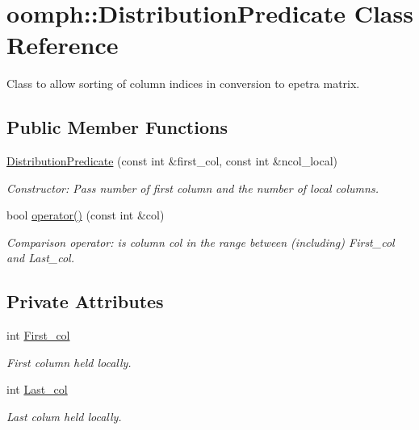 \hypertarget{classoomph_1_1DistributionPredicate}{}\section{oomph\+:\+:Distribution\+Predicate Class Reference}
\label{classoomph_1_1DistributionPredicate}


Class to allow sorting of column indices in conversion to epetra matrix.  


\subsection*{Public Member Functions}
\begin{DoxyCompactItemize}
\item 
\hyperlink{classoomph_1_1DistributionPredicate_a6eed861d5dca10c4118de4857705fd92}{Distribution\+Predicate} (const int \&first\+\_\+col, const int \&ncol\+\_\+local)
\begin{DoxyCompactList}\small\item\em Constructor\+: Pass number of first column and the number of local columns. \end{DoxyCompactList}\item 
bool \hyperlink{classoomph_1_1DistributionPredicate_a701adea6dabe769c65afc647b655f39f}{operator()} (const int \&col)
\begin{DoxyCompactList}\small\item\em Comparison operator\+: is column col in the range between (including) First\+\_\+col and Last\+\_\+col. \end{DoxyCompactList}\end{DoxyCompactItemize}
\subsection*{Private Attributes}
\begin{DoxyCompactItemize}
\item 
int \hyperlink{classoomph_1_1DistributionPredicate_a832f10468911bf3bd8323dc6bdaf10f4}{First\+\_\+col}
\begin{DoxyCompactList}\small\item\em First column held locally. \end{DoxyCompactList}\item 
int \hyperlink{classoomph_1_1DistributionPredicate_a835e3e981b0251f15b3c07d85afe0c3f}{Last\+\_\+col}
\begin{DoxyCompactList}\small\item\em Last colum held locally. \end{DoxyCompactList}\end{DoxyCompactItemize}


